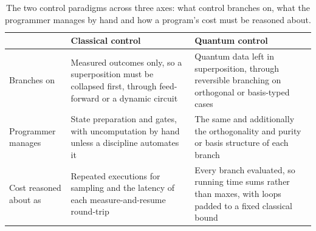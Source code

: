 \begin{table}[htbp]
    \centering
    \begin{tabularx}{\textwidth}{@{}p{2.5cm}XX@{}}
        \toprule
        & \textbf{Classical control} & \textbf{Quantum control} \\
        \midrule
        Branches on
        & Measured outcomes only, so a superposition must be collapsed first, through feed-forward or a dynamic circuit
        & Quantum data left in superposition, through reversible branching on orthogonal or basis-typed cases \\
        \addlinespace
        Programmer manages
        & State preparation and gates, with uncomputation by hand unless a discipline automates it
        & The same and additionally the orthogonality and purity or basis structure of each branch \\
        \addlinespace
        Cost reasoned about as
        & Repeated executions for sampling and the latency of each measure-and-resume round-trip
        & Every branch evaluated, so running time sums rather than maxes, with loops padded to a fixed classical bound \\
        \bottomrule
    \end{tabularx}
    \caption{The two control paradigms across three axes: what control branches on, what the programmer manages by hand and how a program's cost must be reasoned about.}
    \label{tab:lit_rev:quantum_programming:control_paradigms}
\end{table}


